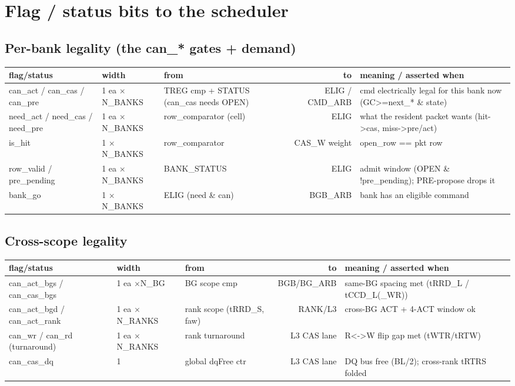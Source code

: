 \documentclass[9pt]{extarticle}
\newenvironment{flag}{%
  \footnotesize\begin{longtable}{EHJNU}
  \rowcolor{hb}\textbf{flag/status} & \textbf{width} & \textbf{from} & \textbf{to} & \textbf{meaning / asserted when}\\ \midrule\endhead}
  {\bottomrule\end{longtable}}
\begin{document}
\section{Flag / status bits to the scheduler}
\subsection*{Per-bank legality (the can\_* gates + demand)}
\begin{flag}
can\_act / can\_cas / can\_pre & 1 ea $\times$N\_BANKS & TREG cmp + STATUS (can\_cas needs OPEN) & ELIG / CMD\_ARB & cmd electrically legal for this bank now (GC>=next\_* \& state)\\
need\_act / need\_cas / need\_pre & 1 ea $\times$N\_BANKS & row\_comparator (cell) & ELIG & what the resident packet wants (hit->cas, miss->pre/act)\\
is\_hit & 1 $\times$N\_BANKS & row\_comparator & CAS\_W weight & open\_row == pkt row\\
row\_valid / pre\_pending & 1 ea $\times$N\_BANKS & BANK\_STATUS & ELIG & admit window (OPEN \& !pre\_pending); PRE-propose drops it\\
bank\_go & 1 $\times$N\_BANKS & ELIG (need \& can) & BGB\_ARB & bank has an eligible command\\
\end{flag}
\subsection*{Cross-scope legality}
\begin{flag}
can\_act\_bgs / can\_cas\_bgs & 1 ea $\times$N\_BG & BG scope cmp & BGB/BG\_ARB & same-BG spacing met (tRRD\_L / tCCD\_L(\_WR))\\
can\_act\_bgd / can\_act\_rank & 1 ea $\times$N\_RANKS & rank scope (tRRD\_S, faw) & RANK/L3 & cross-BG ACT + 4-ACT window ok\\
can\_wr / can\_rd (turnaround) & 1 ea $\times$N\_RANKS & rank turnaround & L3 CAS lane & R<->W flip gap met (tWTR/tRTW)\\
can\_cas\_dq & 1 & global dqFree ctr & L3 CAS lane & DQ bus free (BL/2); cross-rank tRTRS folded\\
\end{flag}
\end{document}
